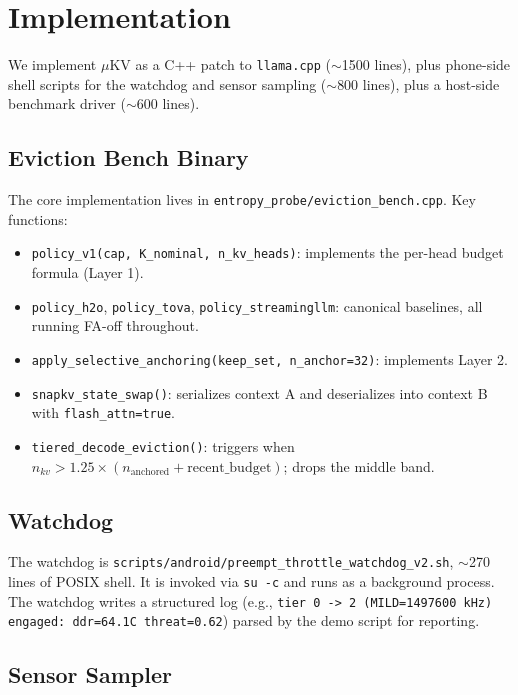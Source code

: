 \documentclass[sigconf, anonymous=false, screen=true]{acmart}
\begin{document}
\section{Implementation}
\label{sec:impl}

We implement \textsc{$\mu$KV} as a C++ patch to \texttt{llama.cpp} ($\sim$1500 lines), plus phone-side shell scripts for the watchdog and sensor sampling ($\sim$800 lines), plus a host-side benchmark driver ($\sim$600 lines).

\subsection{Eviction Bench Binary}

The core implementation lives in \texttt{entropy\_probe/eviction\_bench.cpp}. Key functions:

\begin{itemize}
\item \texttt{policy\_v1(cap, K\_nominal, n\_kv\_heads)}: implements the per-head budget formula (Layer 1).
\item \texttt{policy\_h2o}, \texttt{policy\_tova}, \texttt{policy\_streamingllm}: canonical baselines, all running FA-off throughout.
\item \texttt{apply\_selective\_anchoring(keep\_set, n\_anchor=32)}: implements Layer 2.
\item \texttt{snapkv\_state\_swap()}: serializes context A and deserializes into context B with \texttt{flash\_attn=true}.
\item \texttt{tiered\_decode\_eviction()}: triggers when $n_{kv} > 1.25 \times (n_{\text{anchored}} + \mathrm{recent\_budget})$; drops the middle band.
\end{itemize}

\subsection{Watchdog}

The watchdog is \texttt{scripts/android/preempt\_throttle\_watchdog\_v2.sh}, $\sim$270 lines of POSIX shell. It is invoked via \texttt{su -c} and runs as a background process. The watchdog writes a structured log (e.g., \texttt{tier 0 -> 2 (MILD=1497600 kHz) engaged: ddr=64.1C threat=0.62}) parsed by the demo script for reporting.

\subsection{Sensor Sampler}
\end{document}

